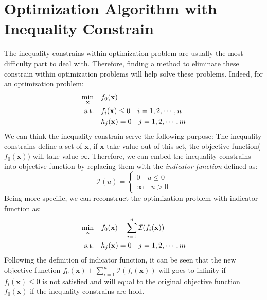 \documentclass[10pt,a4paper]{article}
\begin{document}
\section{Optimization Algorithm with Inequality Constrain}
The inequality constrains within optimization problem are usually the most difficulty part to deal with. Therefore, finding a method to eliminate these constrain within optimization problems will help solve these problems. Indeed, for an optimization problem:
\begin{equation*}
	\begin{aligned}
		\displaystyle\min_{\mathbf{x}} \quad & f_{0}(\mathbf{x}) \\
		\textsl{s.t.} \quad & f_{i}(\mathbf{x}) \leq 0 \quad i = 1, 2, \cdots, n \\
		& h_{j}(\mathbf{x}) = 0 \quad j = 1, 2, \cdots, m
	\end{aligned}
\end{equation*}
We can think the inequality constrain serve the following purpose: The inequality constrains define a set of $\mathbf{x}$, if $\mathbf{x}$ take value out of this set, the objective function($f_{0}(\mathbf{x})$) will take value $\infty$. Therefore, we can embed the inequality constrains into objective function by replacing them with the \textit{indicator function} defined as:
\begin{equation*}
	\mathcal{I}(u) = 
	\begin{cases}
		0 \quad u \leq 0\\
		\infty \quad u > 0
	\end{cases}
\end{equation*} 
Being more specific, we can reconstruct the optimization problem with indicator function as:
\begin{equation*}
	\begin{aligned}
		\displaystyle\min_{\mathbf{x}} \quad & f_{0}(\mathbf{x}) + \displaystyle\sum_{i = 1}^{n} \mathcal{I}(f_{i}(\mathbf{x})) \\
		\textsl{s.t.} \quad & h_{j}(\mathbf{x}) = 0 \quad j = 1, 2, \cdots, m
	\end{aligned}
\end{equation*}
Following the definition of indicator function, it can be seen that the new objective function $f_{0}(\mathbf{x}) + \displaystyle\sum_{i = 1}^{n} \mathcal{I}(f_{i}(\mathbf{x}))$ will goes to infinity if $f_{i}(\mathbf{x}) \leq 0$ is not satisfied and will equal to the original objective function $f_{0}(\mathbf{x})$ if the inequality constrains are hold.
\end{document}

